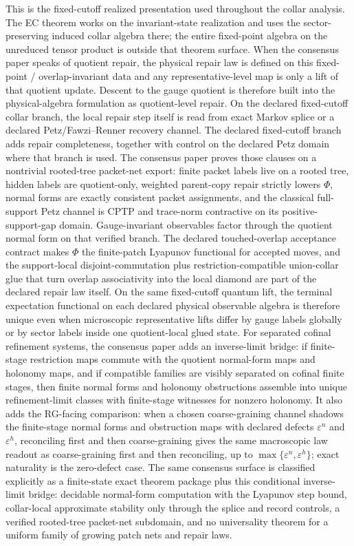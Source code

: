 This is the fixed-cutoff realized presentation used throughout the collar analysis. The EC theorem works on the invariant-state realization and uses the sector-preserving induced collar algebra there; the entire fixed-point algebra on the unreduced tensor product is outside that theorem surface.
When the consensus paper speaks of quotient repair, the physical repair law is defined on
this fixed-point / overlap-invariant data and any representative-level map is only a lift of that
quotient update. Descent to the gauge quotient is therefore built into the physical-algebra
formulation as quotient-level repair. On the
declared fixed-cutoff collar branch, the local repair step itself is read from exact Markov splice
or a declared Petz/Fawzi--Renner recovery channel. The declared fixed-cutoff branch adds
repair completeness, together with control on the declared Petz domain
where that branch is used. The consensus paper proves those clauses on a nontrivial rooted-tree
packet-net export: finite packet labels live on a rooted tree, hidden labels are quotient-only,
weighted parent-copy repair strictly lowers \(\Phi\), normal forms are exactly consistent packet
assignments, and the classical full-support Petz channel is CPTP and trace-norm contractive on
its positive-support-gap domain. Gauge-invariant observables factor through the quotient normal
form on that verified branch. The declared touched-overlap acceptance contract makes \(\Phi\) the
finite-patch Lyapunov functional for accepted moves, and the support-local disjoint-commutation
plus restriction-compatible union-collar glue that turn overlap associativity into the local
diamond are part of the declared repair law itself. On the same fixed-cutoff quantum lift, the
terminal expectation functional on each declared physical observable algebra is therefore unique
even when microscopic representative lifts differ by gauge labels globally or by sector labels
inside one quotient-local glued state.
For separated cofinal refinement systems, the consensus paper adds an inverse-limit bridge:
if finite-stage restriction maps commute with the quotient normal-form maps and holonomy maps,
and if compatible families are visibly separated on cofinal finite stages, then finite normal
forms and holonomy obstructions assemble into unique refinement-limit classes with finite-stage
witnesses for nonzero holonomy. It also adds the RG-facing comparison: when a chosen
coarse-graining channel shadows the finite-stage normal forms and obstruction maps with declared
defects \(\varepsilon^n\) and \(\varepsilon^h\), reconciling first and then coarse-graining gives
the same macroscopic law readout as coarse-graining first and then reconciling, up to
\(\max\{\varepsilon^n,\varepsilon^h\}\); exact naturality is the zero-defect case. The same
consensus surface is classified explicitly as a
finite-state exact theorem package plus this conditional inverse-limit bridge: decidable
normal-form computation with the Lyapunov step bound, collar-local approximate stability only
through the splice and record controls, a verified rooted-tree packet-net subdomain, and no
universality theorem for a uniform family of growing patch nets and repair laws.

